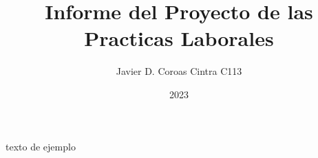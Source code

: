 \documentclass{article}
\title{Informe del Proyecto de las Practicas Laborales}
\author{Javier D. Coroas Cintra C113}
\date{2023}
\begin{document}
\maketitle

texto de ejemplo
\end{document}
